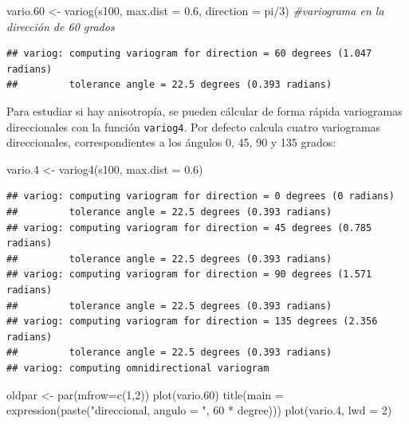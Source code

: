 \documentclass[
  spanish,
]{book}
\newenvironment{Shaded}{\begin{snugshade}}{\end{snugshade}}
\newcommand{\AttributeTok}[1]{\textcolor[rgb]{0.77,0.63,0.00}{#1}}
\newcommand{\CommentTok}[1]{\textcolor[rgb]{0.56,0.35,0.01}{\textit{#1}}}
\newcommand{\DecValTok}[1]{\textcolor[rgb]{0.00,0.00,0.81}{#1}}
\newcommand{\FloatTok}[1]{\textcolor[rgb]{0.00,0.00,0.81}{#1}}
\newcommand{\FunctionTok}[1]{\textcolor[rgb]{0.00,0.00,0.00}{#1}}
\newcommand{\NormalTok}[1]{#1}
\newcommand{\OtherTok}[1]{\textcolor[rgb]{0.56,0.35,0.01}{#1}}
\newcommand{\SpecialCharTok}[1]{\textcolor[rgb]{0.00,0.00,0.00}{#1}}
\newcommand{\StringTok}[1]{\textcolor[rgb]{0.31,0.60,0.02}{#1}}
\theoremstyle{break}
\theoremstyle{definition}
\theoremstyle{definition}
\theoremstyle{definition}
\theoremstyle{definition}
\theoremstyle{remark}
\begin{document}
\begin{Shaded}
\begin{Highlighting}[]
\NormalTok{vario}\FloatTok{.60} \OtherTok{\textless{}{-}} \FunctionTok{variog}\NormalTok{(s100, }\AttributeTok{max.dist =} \FloatTok{0.6}\NormalTok{, }\AttributeTok{direction =}\NormalTok{ pi}\SpecialCharTok{/}\DecValTok{3}\NormalTok{) }\CommentTok{\#variograma en la dirección de 60 grados}
\end{Highlighting}
\end{Shaded}

\begin{verbatim}
## variog: computing variogram for direction = 60 degrees (1.047 radians)
##         tolerance angle = 22.5 degrees (0.393 radians)
\end{verbatim}

Para estudiar si hay anisotropía, se pueden cálcular de forma rápida variogramas
direccionales con la función \texttt{variog4}. Por defecto calcula cuatro variogramas
direccionales, correspondientes a los ángulos 0, 45, 90 y 135 grados:

\begin{Shaded}
\begin{Highlighting}[]
\NormalTok{vario}\FloatTok{.4} \OtherTok{\textless{}{-}} \FunctionTok{variog4}\NormalTok{(s100, }\AttributeTok{max.dist =} \FloatTok{0.6}\NormalTok{)}
\end{Highlighting}
\end{Shaded}

\begin{verbatim}
## variog: computing variogram for direction = 0 degrees (0 radians)
##         tolerance angle = 22.5 degrees (0.393 radians)
## variog: computing variogram for direction = 45 degrees (0.785 radians)
##         tolerance angle = 22.5 degrees (0.393 radians)
## variog: computing variogram for direction = 90 degrees (1.571 radians)
##         tolerance angle = 22.5 degrees (0.393 radians)
## variog: computing variogram for direction = 135 degrees (2.356 radians)
##         tolerance angle = 22.5 degrees (0.393 radians)
## variog: computing omnidirectional variogram
\end{verbatim}

\begin{Shaded}
\begin{Highlighting}[]
\NormalTok{oldpar }\OtherTok{\textless{}{-}} \FunctionTok{par}\NormalTok{(}\AttributeTok{mfrow=}\FunctionTok{c}\NormalTok{(}\DecValTok{1}\NormalTok{,}\DecValTok{2}\NormalTok{))}
\FunctionTok{plot}\NormalTok{(vario}\FloatTok{.60}\NormalTok{)}
\FunctionTok{title}\NormalTok{(}\AttributeTok{main =} \FunctionTok{expression}\NormalTok{(}\FunctionTok{paste}\NormalTok{(}\StringTok{"direccional, angulo = "}\NormalTok{, }\DecValTok{60} \SpecialCharTok{*}\NormalTok{ degree)))}
\FunctionTok{plot}\NormalTok{(vario}\FloatTok{.4}\NormalTok{, }\AttributeTok{lwd =} \DecValTok{2}\NormalTok{)}
\end{Highlighting}
\end{Shaded}
\end{document}
